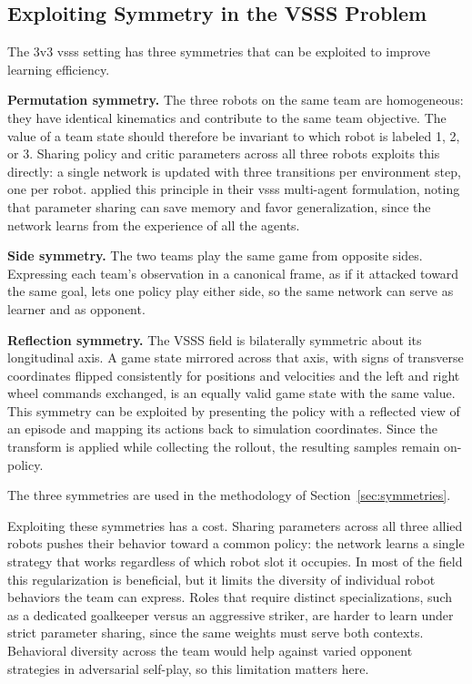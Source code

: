 \subsection{Exploiting Symmetry in the VSSS Problem}
\label{sec:symmetry_theory}

The 3v3 \gls{vsss} setting has three symmetries that can be exploited
to improve learning efficiency.

\textbf{Permutation symmetry.}  The three robots on the same team are
homogeneous: they have identical kinematics and contribute to the same team
objective.  The value of a team state should therefore be invariant to which
robot is labeled 1, 2, or 3.  Sharing policy and critic parameters across all
three robots exploits this directly: a single network is updated with
three transitions per environment step, one per robot.  \textcite{brandao2022} applied
this principle in their \gls{vsss} multi-agent formulation, noting that parameter sharing can save memory and favor
generalization, since the network learns from the experience of all the agents.

\textbf{Side symmetry.}  The two teams play the same game from opposite sides.  Expressing each team's observation in a canonical frame, as if it attacked toward the same goal, lets one policy play
either side, so the same network can serve as learner and as opponent.

\textbf{Reflection symmetry.}  The VSSS field is bilaterally symmetric about
its longitudinal axis.  A game state mirrored across that axis, with signs of
transverse coordinates flipped consistently for positions and velocities and
the left and right wheel commands exchanged, is an equally valid game state
with the same value.  This symmetry can be exploited by presenting the policy
with a reflected view of an episode and mapping its actions back to simulation
coordinates.  Since the transform is applied while collecting the rollout, the
resulting samples remain on-policy.

The three symmetries are used in the methodology of Section~\ref{sec:symmetries}.

Exploiting these symmetries has a cost.
Sharing parameters across all three allied robots pushes their behavior toward
a common policy: the network learns a single strategy that works regardless
of which robot slot it occupies.  In most of the field this regularization is
beneficial, but it limits the diversity of individual robot behaviors the team
can express.  Roles that require distinct specializations, such as a
dedicated goalkeeper versus an aggressive striker, are harder
to learn under strict parameter sharing, since the same weights must serve
both contexts.  Behavioral diversity across the team would help against varied opponent strategies in adversarial self-play, so this limitation matters here.

